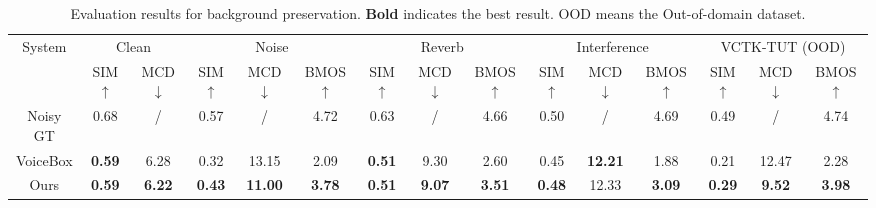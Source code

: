 \begin{table*}[htbp]
    \centering
    \caption{Evaluation results for background preservation. \textbf{Bold} indicates the best result.  OOD means the Out-of-domain dataset. }
    \label{tab:preserve}
    \setlength\tabcolsep{5.2pt}
    \begin{tabular}{c|cc|ccc|ccc|ccc|ccc}
    \toprule
        \multirow{2}{*}{System}&  \multicolumn{2}{c|}{Clean} & \multicolumn{3}{c|}{Noise} & \multicolumn{3}{c|}{Reverb} & \multicolumn{3}{c}{Interference} & \multicolumn{3}{c}{VCTK-TUT (OOD)}  \\ 
     ~ & SIM$\uparrow$ & MCD$\downarrow$ &   SIM$\uparrow$  & MCD$\downarrow$ & BMOS$\uparrow$ &   SIM$\uparrow$  & MCD$\downarrow$ & BMOS$\uparrow$ &   SIM$\uparrow$  & MCD$\downarrow$ & BMOS$\uparrow$ & SIM$\uparrow$  & MCD$\downarrow$ & BMOS$\uparrow$  \\ \midrule
Noisy GT & 0.68 & / & 0.57 & / & 4.72 & 0.63 & / & 4.66 & 0.50 & / & 4.69 & 0.49 & / & 4.74\\ \midrule
         VoiceBox & \textbf{0.59}  & 6.28   & 0.32  & 13.15  & 2.09 & \textbf{0.51}  & 9.30  & 2.60 &  0.45 & \textbf{12.21} & 1.88 & 0.21 & 12.47 & 2.28 \\ 
        Ours & \textbf{0.59}   & \textbf{6.22}   & \textbf{0.43}  & \textbf{11.00}  & \textbf{3.78} & \textbf{0.51}  & \textbf{9.07}  & \textbf{3.51} & \textbf{0.48} & 12.33 & \textbf{3.09} & \textbf{0.29} & \textbf{9.52}  & \textbf{3.98} \\  \bottomrule
    \end{tabular}
        \vspace{-0.2cm}
\end{table*}